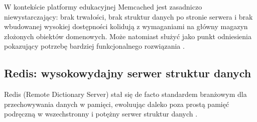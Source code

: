 \noindent
W kontekście platformy edukacyjnej Memcached jest zasadniczo niewystarczający:
brak trwałości, brak struktur danych po stronie serwera i brak wbudowanej wysokiej dostępności
kolidują z wymaganiami na główny magazyn złożonych obiektów domenowych.
Może natomiast służyć jako punkt odniesienia pokazujący potrzebę bardziej funkcjonalnego rozwiązania \cite{memcached-docs}.
\subsection{Redis: wysokowydajny serwer struktur danych}

Redis (Remote Dictionary Server) stał się de facto standardem branżowym dla przechowywania danych w pamięci, ewoluując daleko poza prostą pamięć podręczną w wszechstronny i potężny serwer struktur danych \cite{redis-docs}.

